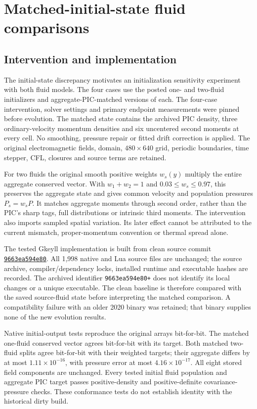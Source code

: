 \section{Matched-initial-state fluid comparisons}
\label{sec:controls}
\subsection{Intervention and implementation}
The initial-state discrepancy motivates an initialization sensitivity
experiment with both fluid models. The four cases use the posted one- and
two-fluid initializers and aggregate-PIC-matched versions of each. The
four-case intervention, solver settings and primary endpoint measurements
were pinned before evolution. The matched state contains the
archived PIC density, three ordinary-velocity momentum densities and six
uncentered second moments at every cell. No smoothing, pressure repair or
fitted drift correction is applied. The original electromagnetic fields,
domain, $480\times640$ grid, periodic boundaries, time stepper, CFL, closures
and source terms are retained.

For two fluids the original smooth positive weights $w_s(y)$ multiply the
entire aggregate conserved vector. With $w_1+w_2=1$ and
$0.03\leq w_s\leq0.97$, this preserves the aggregate state and gives common
velocity and population pressures $P_s=w_s P$. It matches aggregate moments
through second order, rather than the PIC's sharp tags, full distributions
or intrinsic third moments. The intervention also imports sampled spatial
variation. Its later effect cannot be attributed to the current mismatch,
proper-momentum convention or thermal spread alone.

The tested Gkeyll implementation is built from clean source commit
\href{https://github.com/liangwang0734/gkyl/tree/9663ea594e80f68eb305378e14512db390440e6b}{\texttt{9663ea594e80}}.
All 1,998 native and Lua source files are unchanged; the source archive,
compiler/dependency locks, installed runtime and executable hashes are
recorded. The archived identifier \texttt{9663ea594e80+} does not identify
its local changes or a unique executable. The clean baseline is therefore
compared with the saved source-fluid state before interpreting the matched
comparison. A compatibility failure with an older 2020 binary was retained;
that binary supplies none of the new evolution results.

Native initial-output tests reproduce the original arrays bit-for-bit.
The matched one-fluid conserved vector agrees bit-for-bit with its target.
Both matched two-fluid splits agree bit-for-bit with their weighted targets;
their aggregate differs by at most $1.11\times10^{-16}$, with pressure error
at most $4.16\times10^{-17}$. All eight stored field components are unchanged.
Every tested initial fluid population and aggregate PIC target passes positive-density and
positive-definite covariance-pressure checks. These conformance tests do
not establish identity with the historical dirty build.

